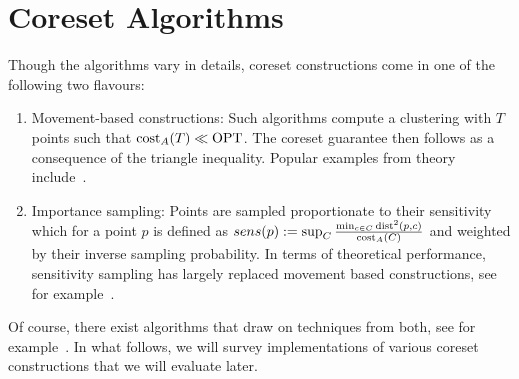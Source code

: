 \section{Coreset Algorithms}

Though the algorithms vary in details, coreset constructions come in one of the following two flavours:
\begin{enumerate}
\item Movement-based constructions: Such algorithms compute a clustering with $T$ points such that $\text{cost}_A(T)\ll \text{OPT}$.
The coreset guarantee then follows as a consequence of the triangle inequality. Popular examples from theory include~\cite{FrahlS2005,HaM04}. 

\item Importance sampling: Points are sampled proportionate to their sensitivity which for a point $p$ is defined as $sens(p):=\sup_{C} \frac{\min_{c\in C} \text{dist}^2(p,c)}{\text{cost}_A(C)}$ and weighted by their inverse sampling probability. In terms of theoretical performance, sensitivity sampling has largely replaced movement based constructions, see for example~\cite{FeldmanL11,LangbergS10}.  
\end{enumerate}

Of course, there exist algorithms that draw on techniques from both, see for example~\cite{Cohen-AddadSS21}. In what follows, we will survey implementations of various coreset constructions that we will evaluate later.



